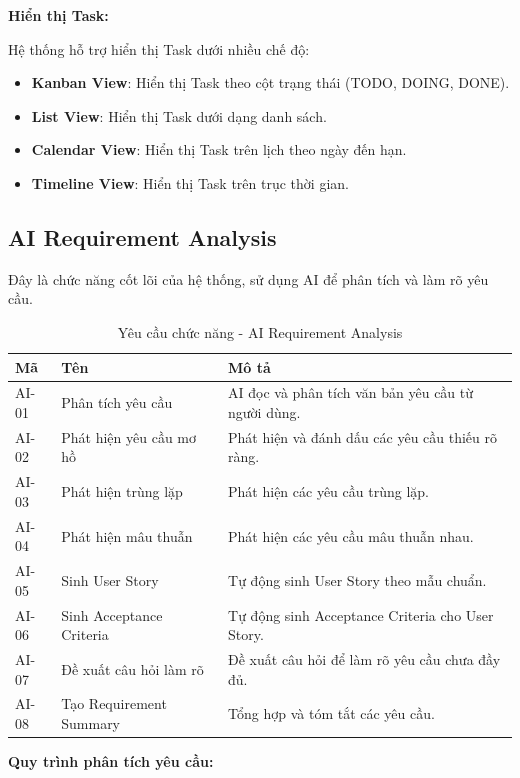 \documentclass[12pt,a4paper]{report}
\begin{document}
\textbf{Hiển thị Task:}

Hệ thống hỗ trợ hiển thị Task dưới nhiều chế độ:

\begin{itemize}
\item \textbf{Kanban View}: Hiển thị Task theo cột trạng thái (TODO, DOING, DONE).
\item \textbf{List View}: Hiển thị Task dưới dạng danh sách.
\item \textbf{Calendar View}: Hiển thị Task trên lịch theo ngày đến hạn.
\item \textbf{Timeline View}: Hiển thị Task trên trục thời gian.
\end{itemize}

\subsection{AI Requirement Analysis}

Đây là chức năng cốt lõi của hệ thống, sử dụng AI để phân tích và làm rõ yêu cầu.

\begin{table}[H]
\centering
\caption{Yêu cầu chức năng - AI Requirement Analysis}
\begin{tabular}{|p{2.5cm}|p{3.5cm}|p{8cm}|}
\hline
\textbf{Mã} & \textbf{Tên} & \textbf{Mô tả} \\
\hline
AI-01 & Phân tích yêu cầu & AI đọc và phân tích văn bản yêu cầu từ người dùng. \\
\hline
AI-02 & Phát hiện yêu cầu mơ hồ & Phát hiện và đánh dấu các yêu cầu thiếu rõ ràng. \\
\hline
AI-03 & Phát hiện trùng lặp & Phát hiện các yêu cầu trùng lặp. \\
\hline
AI-04 & Phát hiện mâu thuẫn & Phát hiện các yêu cầu mâu thuẫn nhau. \\
\hline
AI-05 & Sinh User Story & Tự động sinh User Story theo mẫu chuẩn. \\
\hline
AI-06 & Sinh Acceptance Criteria & Tự động sinh Acceptance Criteria cho User Story. \\
\hline
AI-07 & Đề xuất câu hỏi làm rõ & Đề xuất câu hỏi để làm rõ yêu cầu chưa đầy đủ. \\
\hline
AI-08 & Tạo Requirement Summary & Tổng hợp và tóm tắt các yêu cầu. \\
\hline
\end{tabular}
\label{tab:ai_requirement_requirements}
\end{table}

\textbf{Quy trình phân tích yêu cầu:}
\end{document}
